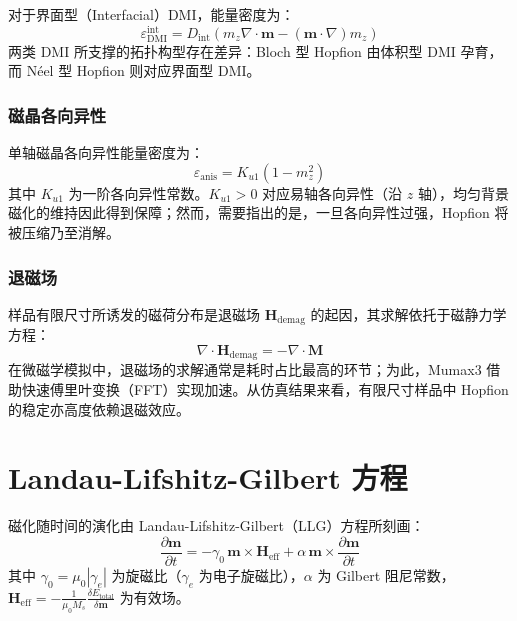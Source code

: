\documentclass{article}
\begin{document}
对于界面型（Interfacial）DMI，能量密度为：
\begin{equation}
  \varepsilon_{\text{DMI}}^{\text{int}} = D_{\text{int}} \left( m_z \nabla \cdot \mathbf{m} - (\mathbf{m} \cdot \nabla) m_z \right)
  \label{eq:dmi-int}
\end{equation}
两类 DMI 所支撑的拓扑构型存在差异：Bloch 型 Hopfion 由体积型 DMI 孕育，而 N\'{e}el 型 Hopfion 则对应界面型 DMI。

\subsubsection*{磁晶各向异性}
单轴磁晶各向异性能量密度为：
\begin{equation}
  \varepsilon_{\text{anis}} = K_{u1} (1 - m_z^2)
  \label{eq:anisotropy}
\end{equation}
其中 $K_{u1}$ 为一阶各向异性常数。$K_{u1} > 0$ 对应易轴各向异性（沿 $z$ 轴），均匀背景磁化的维持因此得到保障；然而，需要指出的是，一旦各向异性过强，Hopfion 将被压缩乃至消解。

\subsubsection*{退磁场}
样品有限尺寸所诱发的磁荷分布是退磁场 $\mathbf{H}_{\text{demag}}$ 的起因，其求解依托于磁静力学方程：
\begin{equation}
  \nabla \cdot \mathbf{H}_{\text{demag}} = -\nabla \cdot \mathbf{M}
  \label{eq:demag}
\end{equation}
在微磁学模拟中，退磁场的求解通常是耗时占比最高的环节；为此，Mumax3 借助快速傅里叶变换（FFT）实现加速。从仿真结果来看，有限尺寸样品中 Hopfion 的稳定亦高度依赖退磁效应。


\section{Landau-Lifshitz-Gilbert 方程}

磁化随时间的演化由 Landau-Lifshitz-Gilbert（LLG）方程所刻画：
\begin{equation}
  \frac{\partial \mathbf{m}}{\partial t} = -\gamma_0 \, \mathbf{m} \times \mathbf{H}_{\text{eff}} + \alpha \, \mathbf{m} \times \frac{\partial \mathbf{m}}{\partial t}
  \label{eq:llg}
\end{equation}
其中 $\gamma_0 = \mu_0 |\gamma_e|$ 为旋磁比（$\gamma_e$ 为电子旋磁比），$\alpha$ 为 Gilbert 阻尼常数，$\mathbf{H}_{\text{eff}} = -\frac{1}{\mu_0 M_s}\frac{\delta E_{\text{total}}}{\delta \mathbf{m}}$ 为有效场。
\end{document}
